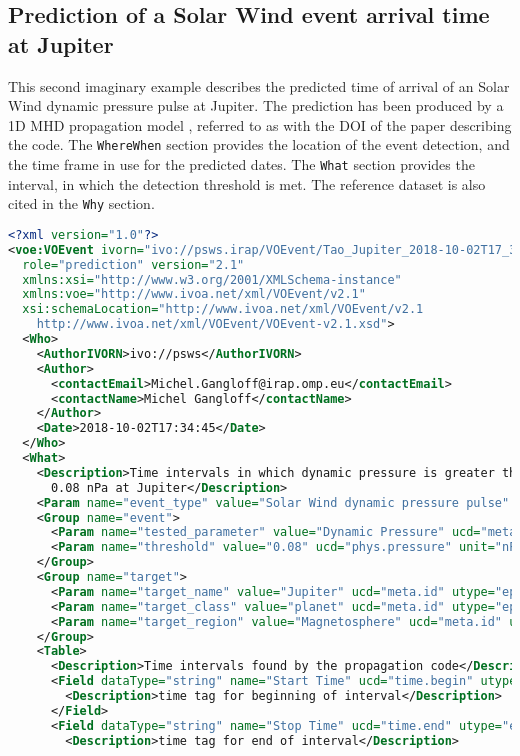 \documentclass[11pt,a4paper]{ivoa}
\begin{document}
\subsection{Prediction of a Solar Wind event arrival time at Jupiter}
This second imaginary example describes the predicted time of arrival of 
an Solar Wind dynamic pressure pulse at Jupiter. The prediction has been  
produced by a 1D MHD propagation model \cite{tao05}, referred to as with
the DOI of the paper describing the code. The \texttt{WhereWhen} section provides
the location of the event detection, and the time frame in use for the 
predicted dates. The \texttt{What} section provides the interval, in which the
detection threshold is met. The reference dataset is also cited in the 
\texttt{Why} section.
\begin{lstlisting}[language=XML]
<?xml version="1.0"?>
<voe:VOEvent ivorn="ivo://psws.irap/VOEvent/Tao_Jupiter_2018-10-02T17_34_45::v1.0" 
  role="prediction" version="2.1" 
  xmlns:xsi="http://www.w3.org/2001/XMLSchema-instance" 
  xmlns:voe="http://www.ivoa.net/xml/VOEvent/v2.1" 
  xsi:schemaLocation="http://www.ivoa.net/xml/VOEvent/v2.1 
    http://www.ivoa.net/xml/VOEvent/VOEvent-v2.1.xsd"> 
  <Who>
    <AuthorIVORN>ivo://psws</AuthorIVORN>
    <Author>
      <contactEmail>Michel.Gangloff@irap.omp.eu</contactEmail>
      <contactName>Michel Gangloff</contactName>
    </Author>
    <Date>2018-10-02T17:34:45</Date>
  </Who>
  <What>
    <Description>Time intervals in which dynamic pressure is greater than 
      0.08 nPa at Jupiter</Description>
    <Param name="event_type" value="Solar Wind dynamic pressure pulse" ucd="meta.id"/>
    <Group name="event">
      <Param name="tested_parameter" value="Dynamic Pressure" ucd="meta.id" dataType="string"/>
      <Param name="threshold" value="0.08" ucd="phys.pressure" unit="nPa" dataType="string"/>
    </Group>
    <Group name="target">
      <Param name="target_name" value="Jupiter" ucd="meta.id" utype="epn:target_name"/>
      <Param name="target_class" value="planet" ucd="meta.id" utype="epn:target_class"/>
      <Param name="target_region" value="Magnetosphere" ucd="meta.id" utype="epn:target_region"/>
    </Group>
    <Table>
      <Description>Time intervals found by the propagation code</Description>
      <Field dataType="string" name="Start Time" ucd="time.begin" utype="epn:time_min">
        <Description>time tag for beginning of interval</Description>
      </Field>
      <Field dataType="string" name="Stop Time" ucd="time.end" utype="epn:time_max">
        <Description>time tag for end of interval</Description>

\end{lstlisting}
\end{document}
